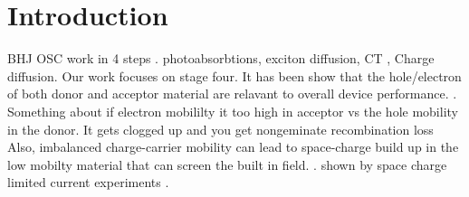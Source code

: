 \chapter{Introduction}

BHJ OSC work in 4 steps . photoabsorbtions, exciton diffusion, CT , Charge diffusion. \citet{Fusella2019}
Our work focuses on stage four. It has been show that the hole/electron of both donor and 
acceptor material are relavant to overall device performance. \cite{Wang2019e}. Something about if electron mobililty it too high in acceptor vs the 
hole mobility in the donor. It gets clogged up and you get nongeminate recombination loss  Also, imbalanced charge-carrier
mobility can lead to space-charge build up in the low mobilty material that can screen the built in field.
\cite{Bartelt2015}. shown by space charge limited current experiments  \cite{Small2013}.

